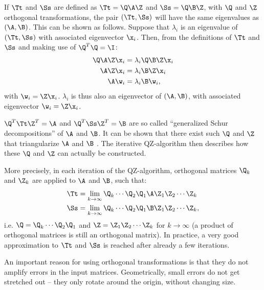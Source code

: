 If $\Tt$ and $\Ss$ are defined as $\Tt = \Q \A \Z$ and $\Ss = \Q \B \Z$, with
$\Q$ and $\Z$ orthogonal transformations,\footnotemark{} the pair $(\Tt,
\Ss)$ will have the same eigenvalues as $(\A, \B)$. This can be shown as
follows. Suppose that $\lambda_i$ is an eigenvalue of $(\Tt,\Ss)$ with
associated eigenvector $\x_i$. Then, from the definitions of $\Tt$ and $\Ss$
and making use of $\Q^T \Q = \I$:
\begin{align*}
\Q \A \Z \x_i      &= \lambda_i \Q \B \Z \x_i  \\
\A \Z \x_i         &= \lambda_i \B \Z \x_i  \\
\A \w_i            &= \lambda_i \B \w_i,  
\end{align*}
with $\w_i = \Z \x_i$. $\lambda_i$ is thus also an eigenvector of $(\A, \B)$,
with associated eigenvector $\w_i = \Z \x_i$.

$\Q^T \Tt \Z^T = \A$ and $\Q^T \Ss \Z^T = \B$ are so called ``generalized
Schur decompositions'' of $\A$ and $\B$. It can be shown that there exist
such $\Q$ and $\Z$ that triangularize $\A$ and $\B$ \cite[Theorem
3.1]{Stewart1972}. The iterative QZ-algorithm \cite{Moler1973} then describes
how these $\Q$ and $\Z$ can actually be constructed.


More precisely, in each iteration of the QZ-algorithm, orthogonal matrices
$\Q_k$ and $\Z_k$ are applied to $\A$ and $\B$, such that:
%
\begin{align*}
\Tt &= \lim_{k \to \infty} \Q_k \cdots \Q_2 \Q_1 \A \Z_1 \Z_2 \cdots \Z_k \\
\Ss &= \lim_{k \to \infty} \Q_k \cdots \Q_2 \Q_1 \B \Z_1 \Z_2 \cdots \Z_k,
\end{align*}
%
i.e. $\Q = \Q_k \cdots \Q_2 \Q_1$ and $\Z = \Z_1 \Z_2 \cdots \Z_k$ for $k \to
\infty$ (a product of orthogonal matrices is still an orthogonal matrix). In
practice, a very good approximation to $\Tt$ and $\Ss$ is reached after
already a few iterations.

An important reason for using orthogonal transformations is that they do not
amplify errors in the input matrices. Geometrically, small errors do not get
stretched out -- they only rotate around the origin, without changing size.


